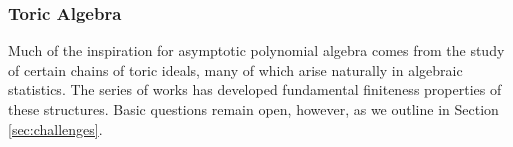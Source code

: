 
%

\subsubsection{Toric Algebra}

Much of the inspiration for asymptotic polynomial algebra comes from the study of certain chains of toric ideals, many of which arise naturally in algebraic statistics.  The series of works \cite{Hillar13, hillar2016corrigendum, draisma2013noetherianity, KKL:equivariant-markov} has developed fundamental finiteness properties of these structures.  Basic questions remain open, however, as we outline in Section \ref{sec:challenges}.


